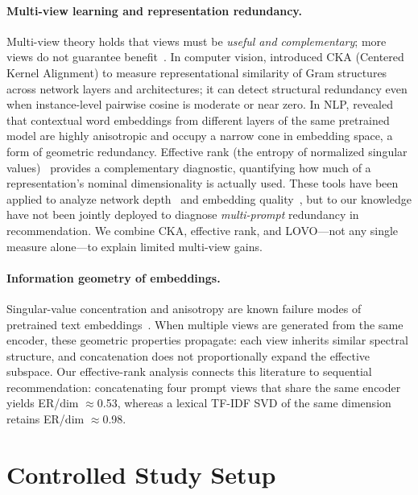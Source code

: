\documentclass[sigconf,natbib=true,anonymous]{acmart}
\newcommand{\tfidf}{\textsc{TF-IDF}\xspace}
\begin{document}
\paragraph{Multi-view learning and representation redundancy.}
Multi-view theory holds that views must be \emph{useful and complementary}; more views do not guarantee benefit~\cite{xu2013multiview}.
In computer vision, \citet{kornblith2019cka} introduced CKA (Centered Kernel Alignment) to measure representational similarity of Gram structures across network layers and architectures; it can detect structural redundancy even when instance-level pairwise cosine is moderate or near zero.
In NLP, \citet{ethayarajh2019contextual} revealed that contextual word embeddings from different layers of the same pretrained model are highly anisotropic and occupy a narrow cone in embedding space, a form of geometric redundancy.
Effective rank (the entropy of normalized singular values)~\cite{roy2007effective} provides a complementary diagnostic, quantifying how much of a representation's nominal dimensionality is actually used.
These tools have been applied to analyze network depth~\cite{kornblith2019cka} and embedding quality~\cite{ethayarajh2019contextual}, but to our knowledge have not been jointly deployed to diagnose \emph{multi-prompt} redundancy in recommendation.
We combine CKA, effective rank, and LOVO---not any single measure alone---to explain limited multi-view gains.

\paragraph{Information geometry of embeddings.}
Singular-value concentration and anisotropy are known failure modes of pretrained text embeddings~\cite{ethayarajh2019contextual}.
When multiple views are generated from the same encoder, these geometric properties propagate: each view inherits similar spectral structure, and concatenation does not proportionally expand the effective subspace.
Our effective-rank analysis connects this literature to sequential recommendation: concatenating four prompt views that share the same encoder yields ER/dim $\approx$0.53, whereas a lexical \tfidf SVD of the same dimension retains ER/dim $\approx$0.98.

\section{Controlled Study Setup}
\label{sec:setup}
\end{document}
